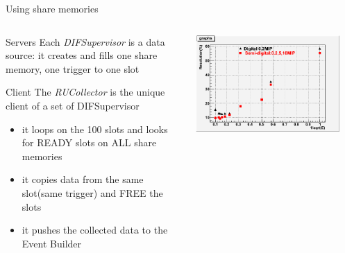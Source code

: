 \begin{frame}{Using share memories}
  \begin{columns}
    \begin{column}{0.5\textwidth}
      \begin{block}{Servers}
        Each {\sl DIFSupervisor} is a data source: it creates and fills one share memory, one trigger to one slot
      \end{block}
      \pause 
      \begin{block}{Client}
        The {\sl RUCollector} is the unique client of a set of DIFSupervisor
        \begin{itemize}
        \item it loops on the 100 slots and looks for READY slots on ALL share memories
        \item it copies data from the same slot(same trigger) and FREE the slots
        \item it pushes the collected data to the Event Builder 
        \end{itemize}
      \end{block}
    \end{column}
    \begin{column}{0.5\textwidth}
      \centerline{\includegraphics[width=0.9\textwidth]{images/DigitalSemiDigital}}
    \end{column}
  \end{columns}


\end{frame}

